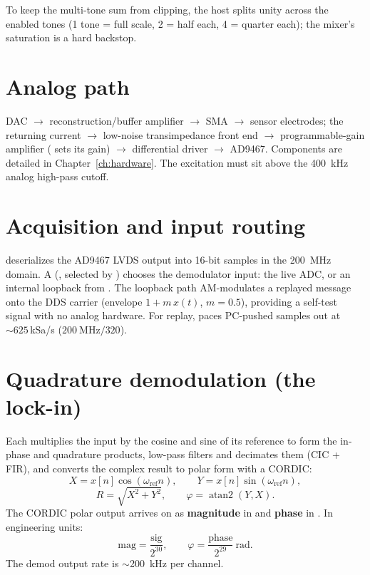 To keep the multi-tone sum from clipping, the host splits unity across the
enabled tones (1 tone = full scale, 2 = half each, 4 = quarter each); the mixer's
saturation is a hard backstop.

\section{Analog path}
DAC $\to$ reconstruction/buffer amplifier $\to$ SMA $\to$ sensor electrodes; the
returning current $\to$ low-noise transimpedance front end $\to$ programmable-gain
amplifier ( sets its gain) $\to$ differential driver $\to$ AD9467.
Components are detailed in Chapter~\ref{ch:hardware}. The excitation must sit
above the \SI{400}{\kilo\hertz} analog high-pass cutoff.

\section{Acquisition and input routing}
 deserializes the AD9467 LVDS output into 16-bit samples
in the \SI{200}{\mega\hertz} domain. A  (, selected by
) chooses the demodulator input: the live ADC, or an internal
loopback from . The loopback path AM-modulates a replayed
message onto the DDS carrier (envelope $1 + m\,x(t)$, $m = 0.5$), providing a
self-test signal with no analog hardware. For replay, 
paces PC-pushed samples out at ${\sim}625$\,kSa/s
($\SI{200}{\mega\hertz}/320$).

\section{Quadrature demodulation (the lock-in)}
\label{sec:lockin}
Each  multiplies the input by the cosine and sine of its
reference to form the in-phase and quadrature products, low-pass filters and
decimates them (CIC + FIR), and converts the complex result to polar form with a
CORDIC:
\[
X = x[n]\cos(\omega_\text{ref} n), \qquad
Y = x[n]\sin(\omega_\text{ref} n),
\]
\[
R = \sqrt{X^2 + Y^2}, \qquad \varphi = \operatorname{atan2}(Y, X).
\]
The CORDIC polar output arrives on  as
\textbf{magnitude } in \code{[31:0]} and \textbf{phase
} in \code{[63:32]}. In engineering units:
\[
\text{mag} = \frac{\text{sig}}{2^{30}}, \qquad \varphi = \frac{\text{phase}}{2^{29}}\ \text{rad}.
\]
The demod output rate is $\sim$\SI{200}{\kilo\hertz} per channel.

